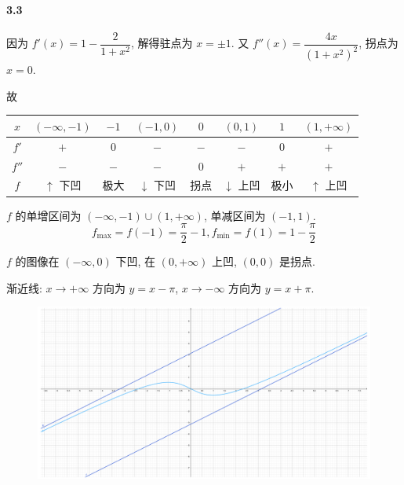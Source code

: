 \paragraph*{3.3} 因为 $f'(x)=1-\dfrac{2}{1+x^2}$, 解得驻点为 $x=\pm 1$. 又 $f''(x)=\dfrac{4x}{\left(1+x^2\right)^2}$, 拐点为 $x=0$.

故
\begin{center}
\begin{tabular}{c|c|c|c|c|c|c|c}
\hline
$x$   & $(-\infty,-1)$ & $-1$ & $(-1,0)$       & $0$ & $(0,1)$         & $1$ & $(1,+\infty)$ \\ \hline
$f'$  & $+$            & $0$  & $-$            & $-$ & $-$             & $0$ & $+$           \\ \hline
$f''$ & $-$            & $-$  & $-$            & $0$ & $+$             & $+$ & $+$           \\ \hline
$f$   & $\uparrow$ 下凹  & 极大   & $\downarrow$ 下凹 & 拐点  & $\downarrow$ 上凹 & 极小  & $\uparrow$ 上凹 \\ \hline
\end{tabular}
\end{center}

$f$ 的单增区间为 $(-\infty,-1)\cup(1,+\infty)$, 单减区间为 $(-1,1)$.
\[
	f_{\max}=f(-1)=\dfrac{\pi}{2}-1,f_{\min}=f(1)=1-\dfrac{\pi}{2}
\]

$f$ 的图像在 $(-\infty,0)$ 下凹, 在 $(0,+\infty)$ 上凹, $(0,0)$ 是拐点.

渐近线: $x\to+\infty$ 方向为 $y=x-\pi$, $x\to-\infty$ 方向为 $y=x+\pi$. 

\begin{figure}[h]
	\centering
		\includegraphics[scale = 0.1]{figure_3.3.pdf}
\end{figure}